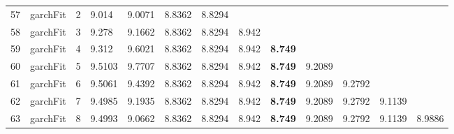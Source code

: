 \documentclass[10pt,a4paper]{article}
\begin{document}
\begin{table}[ht]
\begin{tabular}{rlrllllllllll}
  57 & garchFit &     2 & 9.014 & 9.0071 & 8.8362 & 8.8294 &  &  &  &  &  &  \\ 
  58 & garchFit &     3 & 9.278 & 9.1662 & 8.8362 & 8.8294 & 8.942 &  &  &  &  &  \\ 
  59 & garchFit &     4 & 9.312 & 9.6021 & 8.8362 & 8.8294 & 8.942 & \textbf{8.749} &  &  &  &  \\ 
  60 & garchFit &     5 & 9.5103 & 9.7707 & 8.8362 & 8.8294 & 8.942 & \textbf{8.749} & 9.2089 &  &  &  \\ 
  61 & garchFit &     6 & 9.5061 & 9.4392 & 8.8362 & 8.8294 & 8.942 & \textbf{8.749} & 9.2089 & 9.2792 &  &  \\ 
  62 & garchFit &     7 & 9.4985 & 9.1935 & 8.8362 & 8.8294 & 8.942 & \textbf{8.749} & 9.2089 & 9.2792 & 9.1139 &  \\ 
  63 & garchFit &     8 & 9.4993 & 9.0662 & 8.8362 & 8.8294 & 8.942 & \textbf{8.749} & 9.2089 & 9.2792 & 9.1139 & 8.9886 \\ 
   \hline
\end{tabular}
\end{table}
\end{document}
